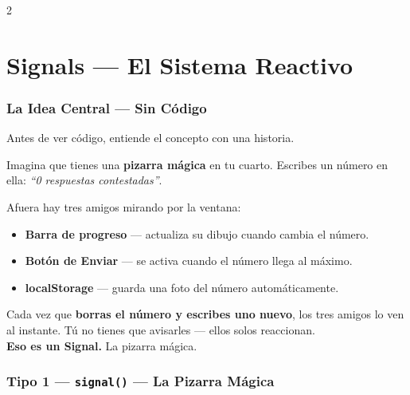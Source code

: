 \documentclass[12pt, a4paper]{article}
\begin{document}
\setcounter{tocdepth}{1}
\begin{multicols}{2}
\tableofcontents
\end{multicols}

\newpage

\part{ Signals — El Sistema Reactivo}

\section{  La Idea Central — Sin Código}

Antes de ver código, entiende el concepto con una historia.

\begin{tcolorbox}[analogia, title={\emoji{magic-wand} \emoji{sparkles} La Pizarra Mágica}]
Imagina que tienes una \textbf{pizarra mágica} en tu cuarto.
Escribes un número en ella: \textit{``0 respuestas contestadas''}.

Afuera hay tres amigos mirando por la ventana:
\begin{itemize}
  \item {} \textbf{Barra de progreso} — actualiza su dibujo cuando cambia el número.
  \item {} \textbf{Botón de Enviar} — se activa cuando el número llega al máximo.
  \item {} \textbf{localStorage} — guarda una foto del número automáticamente.
\end{itemize}
Cada vez que \textbf{borras el número y escribes uno nuevo}, los tres amigos lo ven al instante.
Tú no tienes que avisarles — ellos solos reaccionan.\\[0.3cm]
\textbf{Eso es un Signal.} La pizarra mágica.
\end{tcolorbox}

\section{  Tipo 1 — \texttt{signal()} — La Pizarra Mágica}
\end{document}

